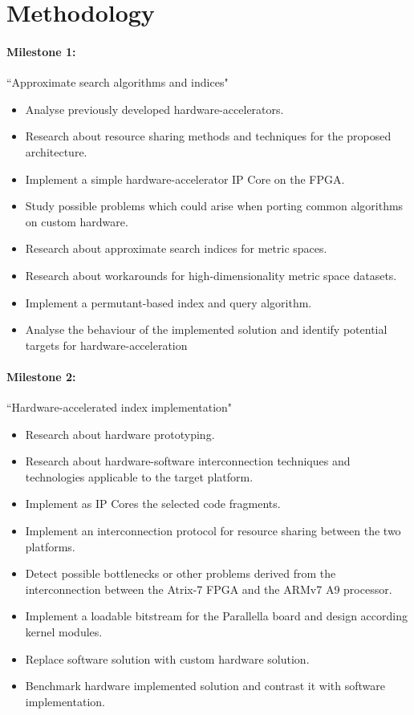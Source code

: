 \documentclass[11pt,letterpaper]{article}
\begin{document}
\section{Methodology}

\paragraph{Milestone 1:} ``Approximate search algorithms and indices"
\begin{itemize}
    \item Analyse previously developed hardware-accelerators.
    \item Research about resource sharing methods and techniques for the proposed architecture.
    \item Implement a simple hardware-accelerator IP Core on the FPGA.
    \item Study possible problems which could arise when porting common algorithms on custom hardware.
    \item Research about approximate search indices for metric spaces.
    \item Research about workarounds for high-dimensionality metric space datasets.
    \item Implement a permutant-based index and query algorithm.
    \item Analyse the behaviour of the implemented solution and identify potential targets for hardware-acceleration
\end{itemize}

\paragraph{Milestone 2:} ``Hardware-accelerated index implementation"
\begin{itemize}
    \item Research about hardware prototyping.
    \item Research about hardware-software interconnection techniques and technologies applicable to the
    target platform. 
    \item Implement as IP Cores the selected code fragments.
    \item Implement an interconnection protocol for resource sharing between the two platforms.
    \item Detect possible bottlenecks or other problems derived from the interconnection between the Atrix-7 
    FPGA and the ARMv7 A9 processor.
    \item Implement a loadable bitstream for the Parallella board and design according kernel modules.
    \item Replace software solution with custom hardware solution.
    \item Benchmark hardware implemented solution and contrast it with software implementation.
\end{itemize}
\end{document}
